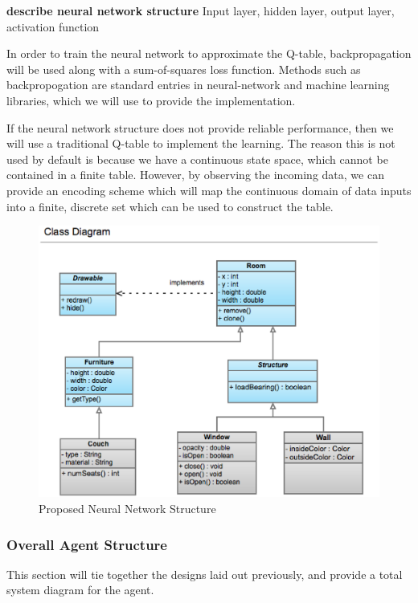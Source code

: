 \documentclass[draftclsnofoot,onecolumn,letterpaper,10pt]{IEEEtran}
\begin{document}
\textbf{describe neural network structure}
Input layer, hidden layer, output layer, activation function

In order to train the neural network to approximate the Q-table, backpropagation will be used along with a sum-of-squares loss function.
Methods such as backpropogation are standard entries in neural-network and machine learning libraries, which we will use to provide the implementation.

If the neural network structure does not provide reliable performance, then we will use a traditional Q-table to implement the learning.
The reason this is not used by default is because we have a continuous state space, which cannot be contained in a finite table.
However, by observing the incoming data, we can provide an encoding scheme which will map the continuous domain of data inputs into a finite, discrete set which can be used to construct the table.


\begin{figure}\label{fig:nn}
\begin{center}
	\caption{Proposed Neural Network Structure}
	\includegraphics[scale=0.3]{tmp.eps}
\end{center}
\end{figure}

\subsubsection{Overall Agent Structure}
This section will tie together the designs laid out previously, and provide a total system diagram for the agent.
\end{document}

